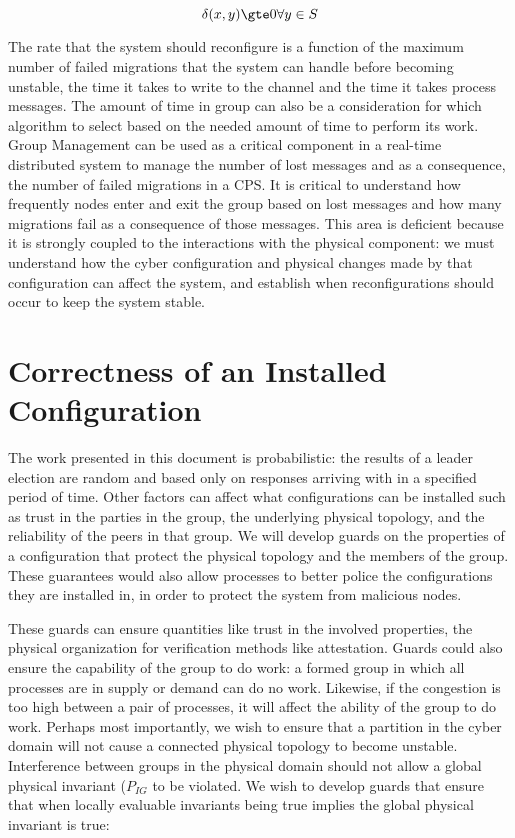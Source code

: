 \begin{equation}
{ \delta(x,y) \gte 0 \forall y \in S }
\end{equation}

The rate that the system should reconfigure is a function of the maximum number of failed migrations that the system can handle before becoming unstable, the time it takes to write to the channel and the time it takes process messages.
The amount of time in group can also be a consideration for which algorithm to select based on the needed amount of time to perform its work.
Group Management can be used as a critical component in a real-time distributed system to manage the number of lost messages and as a consequence, the number of failed migrations in a CPS.
It is critical to understand how frequently nodes enter and exit the group based on lost messages and how many migrations fail as a consequence of those messages.
This area is deficient because it is strongly coupled to the interactions with the physical component: we must understand how the cyber configuration and physical changes made by that configuration can affect the system, and establish when reconfigurations should occur to keep the system stable.

\section{Correctness of an Installed Configuration}

The work presented in this document is probabilistic: the results of a leader election are random and based only on responses arriving with in a specified period of time.
Other factors can affect what configurations can be installed such as trust in the parties in the group, the underlying physical topology, and the reliability of the peers in that group.
We will develop guards on the properties of a configuration that protect the physical topology and the members of the group.
These guarantees would also allow processes to better police the configurations they are installed in, in order to protect the system from malicious nodes.

These guards can ensure quantities like trust in the involved properties, the physical organization for verification methods like attestation.
Guards could also ensure the capability of the group to do work: a formed group in which all processes are in supply or demand can do no work.
Likewise, if the congestion is too high between a pair of processes, it will affect the ability of the group to do work.
Perhaps most importantly, we wish to ensure that a partition in the cyber domain will not cause a connected physical topology to become unstable.
Interference between groups in the physical domain should not allow a global physical invariant ($P_{IG}$ to be violated.
We wish to develop guards that ensure that when locally evaluable invariants being true implies the global physical invariant is true:

